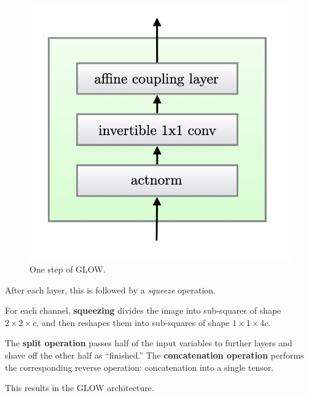   \begin{figure}[H]
    \centering 
    \includegraphics[scale=0.4]{img/glow_step.png}
    \caption{One step of GLOW.} 
    \label{fig:glow_step}
  \end{figure}

  After each layer, this is followed by a \textit{squeeze} operation. 

  \begin{definition}
    For each channel, \textbf{squeezing} divides the image into sub-squares of shape $2 \times 2 \times c$, and then reshapes them into sub-squares of shape $1 \times 1 \times 4c$. 
  \end{definition}


  \begin{definition}
    The \textbf{split operation} passes half of the input variables to further layers and shave off the other half as ``finished.'' The \textbf{concatenation operation} performs the corresponding reverse operation: concatenation into a single tensor. 
  \end{definition}

  This results in the GLOW architecture. 

